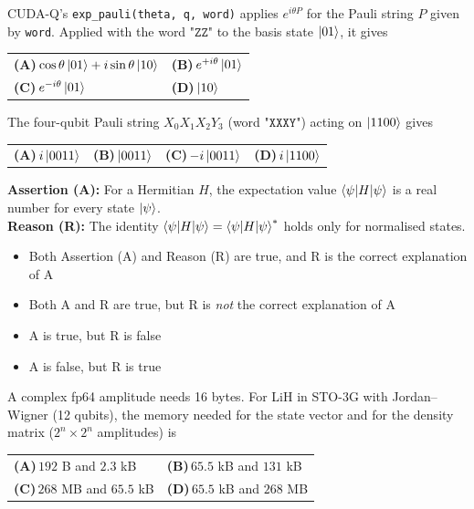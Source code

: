 \documentclass[11pt,a4paper]{article}
\newcommand{\optlabel}[1]{\textbf{(#1)}}
\newenvironment{qitem}[1]{\begin{list}{}{\setlength{\leftmargin}{3.3em}\setlength{\labelwidth}{3.1em}%
  \setlength{\labelsep}{0.2em}\setlength{\topsep}{3pt}\setlength{\parsep}{3pt}}\item[\textbf{Q.#1}\hfill]}{\end{list}}
\newcommand{\qsep}{\par\vspace{2pt}{\color{black!15}\hrule}\vspace{4pt}}
\begin{document}
\begin{qitem}{30}
CUDA-Q's \texttt{exp\_pauli(theta, q, word)} applies $e^{i\theta P}$ for the Pauli string $P$ given by \texttt{word}. Applied with the word
$\texttt{"ZZ"}$ to the basis state $\ket{01}$, it gives
\par\smallskip\noindent\begin{tabularx}{\linewidth}{@{}*{2}{L}@{}}
\optlabel{A}\,$\cos\theta\ket{01} + i\sin\theta\ket{10}$ & \optlabel{B}\,$e^{+i\theta}\ket{01}$ \\[3pt]
\optlabel{C}\,$e^{-i\theta}\ket{01}$ & \optlabel{D}\,$\ket{10}$
\end{tabularx}
\end{qitem}
\qsep

\begin{qitem}{31}
The four-qubit Pauli string $X_0X_1X_2Y_3$ (word $\texttt{"XXXY"}$) acting on $\ket{1100}$ gives
\par\smallskip\noindent\begin{tabularx}{\linewidth}{@{}*{4}{L}@{}}
\optlabel{A}\,$i\ket{0011}$ & \optlabel{B}\,$\ket{0011}$ & \optlabel{C}\,$-i\ket{0011}$ & \optlabel{D}\,$i\ket{1100}$
\end{tabularx}
\end{qitem}
\qsep

\begin{qitem}{32}
\textbf{Assertion (A):} For a Hermitian $H$, the expectation value $\braket{\psi|H|\psi}$ is a real number for every state $\ket\psi$.\\[1mm]
\textbf{Reason (R):} The identity $\braket{\psi|H|\psi} = \braket{\psi|H|\psi}^*$ holds only for normalised states.
\begin{itemize}[leftmargin=2.6em, labelsep=0.4em, itemsep=2pt, topsep=3pt]
\item[\optlabel{A}] Both Assertion (A) and Reason (R) are true, and R is the correct explanation of A
\item[\optlabel{B}] Both A and R are true, but R is \emph{not} the correct explanation of A
\item[\optlabel{C}] A is true, but R is false
\item[\optlabel{D}] A is false, but R is true
\end{itemize}
\end{qitem}
\qsep

\begin{qitem}{33}
A complex fp64 amplitude needs 16 bytes. For LiH in STO-3G with Jordan--Wigner (12 qubits), the memory needed for the state vector and
for the density matrix ($2^n\times2^n$ amplitudes) is
\par\smallskip\noindent\begin{tabularx}{\linewidth}{@{}*{2}{L}@{}}
\optlabel{A}\,$192$ B and $2.3$ kB & \optlabel{B}\,$65.5$ kB and $131$ kB \\[3pt]
\optlabel{C}\,$268$ MB and $65.5$ kB & \optlabel{D}\,$65.5$ kB and $268$ MB
\end{tabularx}
\end{qitem}
\qsep
\end{document}
